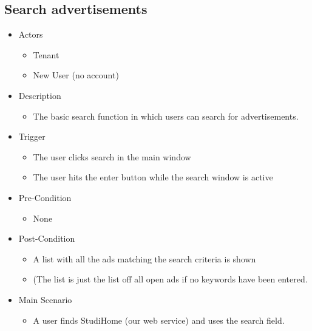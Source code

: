 \documentclass[a4paper,11pt]{article}
\begin{document}
\subsection*{Search advertisements}
\begin{itemize}
	\item Actors
		\begin{itemize}
			\item Tenant
			\item New User (no account)
		\end{itemize}
	\item Description
		\begin{itemize}
			\item The basic search function in which users can search for advertisements.
		\end{itemize}
	\item Trigger
		\begin{itemize}
			\item The user clicks search in the main window
			\item The user hits the enter button while the search window is active
		\end{itemize}
	\item Pre-Condition
		\begin{itemize}
			\item None
		\end{itemize}
	\item Post-Condition
		\begin{itemize}
			\item A list with all the ads matching the search criteria is shown
			\item (The list is just the list off all open ads if no keywords have been entered.
		\end{itemize}
	\item Main Scenario
		\begin{itemize}
			\item A user finds StudiHome (our web service) and uses the search field.
		\end{itemize}
\end{itemize}
\end{document}
